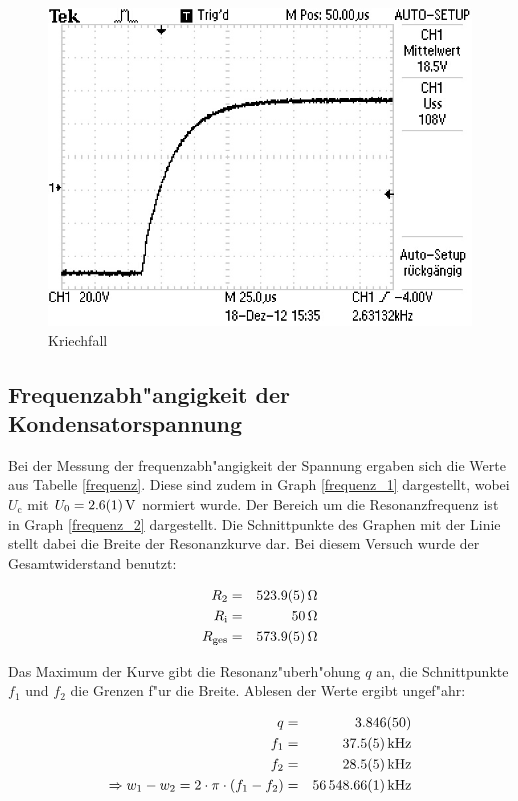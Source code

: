 	\begin{figure}[H]
		\centering
		\includegraphics[width = 12cm]{img/F0001TEK.jpg}
		\caption{Kriechfall}
		\label{ap_3}
	\end{figure}

	\subsection{Frequenzabh"angigkeit der Kondensatorspannung} %
	\label{sub:frequenzabh"angigkeit_der_kondensatorspannung}
	
	Bei der Messung der frequenzabh"angigkeit der Spannung ergaben sich die Werte aus Tabelle \eqref{frequenz}.
	Diese sind zudem in Graph \eqref{frequenz_1} dargestellt, wobei $U_\mathrm{c}$ mit $U_\mathrm{0} = \SI{2.6 (1)}{\volt}$ normiert wurde.
	Der Bereich um die Resonanzfrequenz ist in Graph \eqref{frequenz_2} dargestellt. Die Schnittpunkte des Graphen mit der Linie stellt dabei die Breite der Resonanzkurve dar.
	Bei diesem Versuch wurde der Gesamtwiderstand benutzt:

	\begin{eqnarray*}
		R_\mathrm{2} &=& \SI{523.9 (5)}{\ohm}\\
		R_\mathrm{i} &=& \SI{50}{\ohm}\\
		R_\mathrm{ges} &=& \SI{573.9 (5)}{\ohm}
	\end{eqnarray*}

	Das Maximum der Kurve gibt die Resonanz"uberh"ohung $q$ an, die Schnittpunkte $f_1$ und $f_2$ die Grenzen f"ur die Breite.
	Ablesen der Werte ergibt ungef"ahr:

	\begin{eqnarray*}
		q &=& \SI{3.846 (50)}{}\\
		f_1 &=& \SI{37.5 (5)}{\kilo\hertz}\\
		f_2 &=& \SI{28.5 (5)}{\kilo\hertz}\\
		\Rightarrow w_1 - w_2 = 2 \cdot \pi \cdot (f_1 - f_2) &=& \SI{56548.66 (1)}{\kilo\hertz}\\
	\end{eqnarray*}

